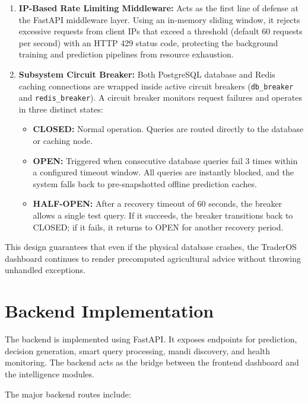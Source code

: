 \documentclass[12pt,a4paper]{report}
\begin{document}
\begin{enumerate}
    \item \textbf{IP-Based Rate Limiting Middleware:} 
    Acts as the first line of defense at the FastAPI middleware layer. Using an in-memory sliding window, it rejects excessive requests from client IPs that exceed a threshold (default 60 requests per second) with an HTTP 429 status code, protecting the background training and prediction pipelines from resource exhaustion.
    
    \item \textbf{Subsystem Circuit Breaker:}
    Both PostgreSQL database and Redis caching connections are wrapped inside active circuit breakers (\texttt{db\_breaker} and \texttt{redis\_breaker}). A circuit breaker monitors request failures and operates in three distinct states:
    
    \begin{itemize}
        \item \textbf{CLOSED:} Normal operation. Queries are routed directly to the database or caching node.
        \item \textbf{OPEN:} Triggered when consecutive database queries fail 3 times within a configured timeout window. All queries are instantly blocked, and the system falls back to pre-snapshotted offline prediction caches.
        \item \textbf{HALF-OPEN:} After a recovery timeout of 60 seconds, the breaker allows a single test query. If it succeeds, the breaker transitions back to CLOSED; if it fails, it returns to OPEN for another recovery period.
    \end{itemize}
\end{enumerate}

This design guarantees that even if the physical database crashes, the TraderOS dashboard continues to render precomputed agricultural advice without throwing unhandled exceptions.

\section{Backend Implementation}

The backend is implemented using FastAPI. It exposes endpoints for prediction, decision generation, smart query processing, mandi discovery, and health monitoring. The backend acts as the bridge between the frontend dashboard and the intelligence modules.

The major backend routes include:
\end{document}
